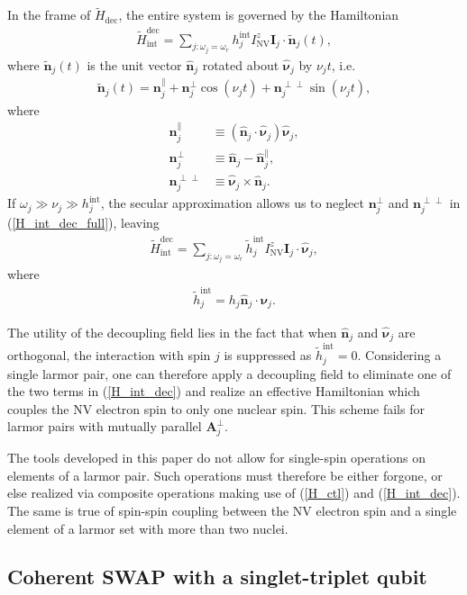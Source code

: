 \documentclass[twocolumn]{revtex4}
\renewcommand{\t}{\text} %
\newcommand{\p}[1]{\left(#1\right)} %
\renewcommand{\v}{\bm} %
\newcommand{\uv}[1]{\hat{\v{#1}}} %
\renewcommand{\c}{\cdot} %
\newcommand{\NV}{\t{NV}}
\begin{document}
In the frame of $\tilde H_\t{dec}$, the entire system is governed by
the Hamiltonian
\begin{align}
  \tilde H_\t{int}^\t{dec} = \sum_{j:\omega_j=\omega_r}
  h_j^\t{int}I_\NV^z\v I_j\c\tilde{\v n}_j\p{t},
  \label{H_int_dec_full}
\end{align}
where $\tilde{\v n}_j\p{t}$ is the unit vector $\uv n_j$ rotated
about $\uv\nu_j$ by $\nu_jt$, i.e.
\begin{align}
  \tilde{\v n}_j\p{t} = \v n_j^\parallel +
  \v n_j^\perp\cos\p{\nu_jt} + \v n_j^{\perp\perp}\sin\p{\nu_jt},
\end{align}
where
\begin{align}
  \v n_j^\parallel &\equiv \p{\uv n_j\c\uv\nu_j}\uv\nu_j, \\
  \v n_j^\perp &\equiv \uv n_j - \uv n_j^\parallel, \\
  \v n_j^{\perp\perp} &\equiv \uv\nu_j\times\uv n_j.
\end{align}
If $\omega_j\gg\nu_j\gg h_j^\t{int}$, the secular approximation allows
us to neglect $\v n_j^\perp$ and $\v n_j^{\perp\perp}$ in
(\ref{H_int_dec_full}), leaving
\begin{align}
  \tilde H_\t{int}^\t{dec}
  = \sum_{j:\omega_j=\omega_r}
  \tilde h_j^\t{int}I_\NV^z\v I_j\c\uv\nu_j,
  \label{H_int_dec}
\end{align}
where
\begin{align}
  \tilde h_j^\t{int} = h_j\uv n_j\c\uv\nu_j.
\end{align}

The utility of the decoupling field lies in the fact that when
$\uv n_j$ and $\uv\nu_j$ are orthogonal, the interaction with spin $j$
is suppressed as $\tilde h_j^\t{int}=0$. Considering a single larmor
pair, one can therefore apply a decoupling field to eliminate one of
the two terms in (\ref{H_int_dec}) and realize an effective
Hamiltonian which couples the NV electron spin to only one nuclear
spin. This scheme fails for larmor pairs with mutually parallel
$\v A_j^\perp$.

The tools developed in this paper do not allow for single-spin
operations on elements of a larmor pair. Such operations must
therefore be either forgone, or else realized via composite operations
making use of (\ref{H_ctl}) and (\ref{H_int_dec}). The same is true of
spin-spin coupling between the NV electron spin and a single element
of a larmor set with more than two nuclei.

\subsection{Coherent SWAP with a singlet-triplet qubit}
\end{document}
